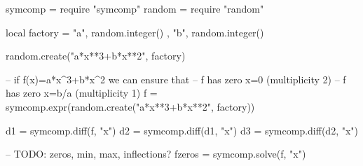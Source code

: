 \begin{luacode*}
    symcomp = require "symcomp"
    random = require "random"

    local factory = 
    {
        { "a", random.integer() },
        { "b", random.integer() }
    }

    random.create("a*x**3+b*x**2", factory)

    -- if f(x)=a*x^3+b*x^2 we can ensure that
    -- f has zero x=0 (multiplicity 2)
    -- f has zero x=b/a (multiplicity 1)
    f = symcomp.expr(random.create("a*x**3+b*x**2", factory))

    d1 = symcomp.diff(f, "x")
    d2 = symcomp.diff(d1, "x")
    d3 = symcomp.diff(d2, "x")

    -- TODO: zeros, min, max, inflections?
    fzeros = symcomp.solve(f, "x")
\end{luacode*}

